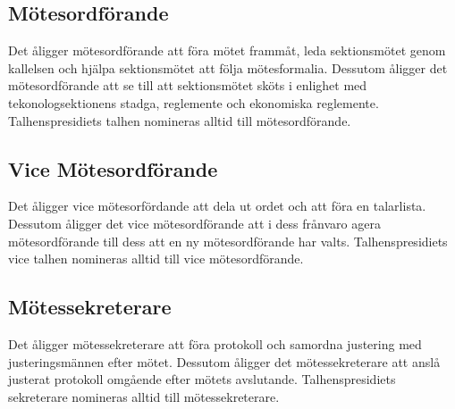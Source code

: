 \subsection{Mötesordförande}
Det åligger mötesordförande att föra mötet frammåt, leda sektionsmötet genom kallelsen och hjälpa sektionsmötet att följa mötesformalia.
Dessutom åligger det mötesordförande att se till att sektionsmötet sköts i enlighet med tekonologsektionens stadga, reglemente och ekonomiska reglemente.
Talhenspresidiets talhen nomineras alltid till mötesordförande.
\subsection{Vice Mötesordförande}
Det åligger vice mötesorfördande att dela ut ordet och att föra en talarlista.
Dessutom åligger det vice mötesordförande att i dess frånvaro agera mötesordförande till dess att en ny mötesordförande har valts.
Talhenspresidiets vice talhen nomineras alltid till vice mötesordförande.
\subsection{Mötessekreterare}
Det åligger mötessekreterare att föra protokoll och samordna justering med justeringsmännen efter mötet. 
Dessutom åligger det mötessekreterare att anslå justerat protokoll omgående efter mötets avslutande.
Talhenspresidiets sekreterare nomineras alltid till mötessekreterare.

\newpage

